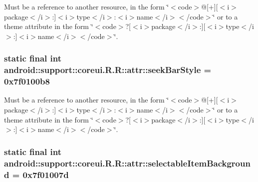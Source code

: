 Must be a reference to another resource, in the form \char`\"{}$<$code$>$@\mbox{[}+\mbox{]}\mbox{[}$<$i$>$package$<$/i$>$:\mbox{]}$<$i$>$type$<$/i$>$:$<$i$>$name$<$/i$>$$<$/code$>$\char`\"{} or to a theme attribute in the form \char`\"{}$<$code$>$?\mbox{[}$<$i$>$package$<$/i$>$:\mbox{]}\mbox{[}$<$i$>$type$<$/i$>$:\mbox{]}$<$i$>$name$<$/i$>$$<$/code$>$\char`\"{}. \hypertarget{classandroid_1_1support_1_1coreui_1_1_r_1_1attr_6c2f5c0e497629868a432c09d62b6b1d}{
\subsubsection[{seekBarStyle}]{\setlength{\rightskip}{0pt plus 5cm}static final int android::support::coreui.R.R::attr::seekBarStyle = 0x7f0100b8}}
\label{classandroid_1_1support_1_1coreui_1_1_r_1_1attr_6c2f5c0e497629868a432c09d62b6b1d}


Must be a reference to another resource, in the form \char`\"{}$<$code$>$@\mbox{[}+\mbox{]}\mbox{[}$<$i$>$package$<$/i$>$:\mbox{]}$<$i$>$type$<$/i$>$:$<$i$>$name$<$/i$>$$<$/code$>$\char`\"{} or to a theme attribute in the form \char`\"{}$<$code$>$?\mbox{[}$<$i$>$package$<$/i$>$:\mbox{]}\mbox{[}$<$i$>$type$<$/i$>$:\mbox{]}$<$i$>$name$<$/i$>$$<$/code$>$\char`\"{}. \hypertarget{classandroid_1_1support_1_1coreui_1_1_r_1_1attr_ae136fce7d680c130876f5878f2fe5c7}{
\subsubsection[{selectableItemBackground}]{\setlength{\rightskip}{0pt plus 5cm}static final int android::support::coreui.R.R::attr::selectableItemBackground = 0x7f01007d}}
\label{classandroid_1_1support_1_1coreui_1_1_r_1_1attr_ae136fce7d680c130876f5878f2fe5c7}


